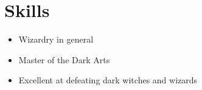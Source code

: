 \documentclass[12pt, letterpaper, twoside] {article}
\begin{document}
\section{Skills}

\begin{itemize}
    \item Wizardry in general
    \item Master of the Dark Arts
    \item Excellent at defeating dark witches and wizards
\end{itemize}
\end{document}
